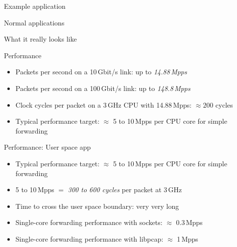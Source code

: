 \documentclass[NET,english,aspectratio=169]{tumbeamer}
\begin{document}
\begin{frame}{Example application}
\centering
\end{frame}


\begin{frame}{Normal applications}
\centering
\end{frame}

\begin{frame}{What it really looks like}
\centering
\end{frame}

\begin{frame}{Performance}
\begin{itemize}
\item Packets per second on a 10\,Gbit/s link: up to \emph{14.88\,Mpps}
\item<2-> Packets per second on a 100\,Gbit/s link: up to \emph{148.8\,Mpps}
\item<3-> Clock cycles per packet on a 3\,GHz CPU with 14.88\,Mpps: $\approx 200$ cycles
\item<3-> Typical performance target: $\approx$ 5 to 10\,Mpps per CPU core for simple forwarding
\end{itemize}
\end{frame}

\begin{frame}{Performance: User space app}
\begin{itemize}
\item<1-> Typical performance target: $\approx$ 5 to 10\,Mpps per CPU core for simple forwarding
\item<1-> 5 to 10\,Mpps $=$ \emph{300 to 600 cycles} per packet at 3\,GHz
\vspace{1em}
\item<2-> Time to cross the user space boundary: very very long
\vspace{1em}
\item<3-> Single-core forwarding performance with sockets: $\approx$ 0.3\,Mpps
\item<3-> Single-core forwarding performance with libpcap: $\approx$ 1\,Mpps
\end{itemize}
\end{frame}
\end{document}
